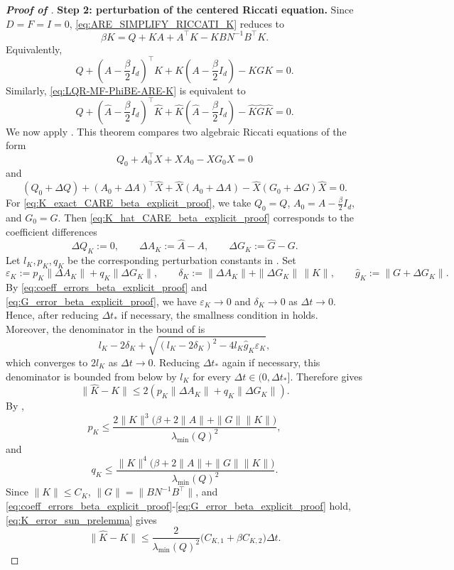 \documentclass[a4paper, 10pt, english, reqno]{amsart}
\begin{document}
\begin{proof}[\textbf{Proof of }]
\medskip
\noindent
\textbf{Step 2: perturbation of the centered Riccati equation.}
Since $D=F=I=0$, \eqref{eq:ARE_SIMPLIFY_RICCATI_K} reduces to
\[
  \beta K
  =
  Q+KA+A^\top K-KBN^{-1}B^\top K.
\]
Equivalently,
\begin{equation}
\label{eq:K_exact_CARE_beta_explicit_proof}
  Q
  +
  \left(A-\frac{\beta}{2}I_d\right)^\top K
  +
  K\left(A-\frac{\beta}{2}I_d\right)
  -
  KGK
  =
  0.
\end{equation}
Similarly, \eqref{eq:LQR-MF-PhiBE-ARE-K} is equivalent to
\begin{equation}
\label{eq:K_hat_CARE_beta_explicit_proof}
  Q
  +
  \left(\hat A-\frac{\beta}{2}I_d\right)^\top\hat K
  +
  \hat K\left(\hat A-\frac{\beta}{2}I_d\right)
  -
  \hat K\hat G\hat K
  =
  0.
\end{equation}
We now apply \cite[Theorem~3.1]{Sun1998}. This theorem compares two algebraic Riccati equations of the form
\[
Q_0+A_0^\top X+XA_0-XG_0X=0
\]
and
\[
(Q_0+\Delta Q)+(A_0+\Delta A)^\top \hat X+\hat X(A_0+\Delta A)-\hat X(G_0+\Delta G)\hat X=0.
\]
For \eqref{eq:K_exact_CARE_beta_explicit_proof}, we take $Q_0=Q$, $A_0=A-\frac{\beta}{2}I_d$, and $G_0=G$. Then \eqref{eq:K_hat_CARE_beta_explicit_proof} corresponds to the coefficient differences
\[
\Delta Q_K:=0,
\qquad
\Delta A_K:=\hat A-A,
\qquad
\Delta G_K:=\hat G-G.
\]
Let $l_K,p_K,q_K$ be the corresponding perturbation constants in \cite[Theorem~3.1]{Sun1998}. Set
\[
\varepsilon_K:=p_K\|\Delta A_K\|+q_K\|\Delta G_K\|,
\qquad
\delta_K:=\|\Delta A_K\|+\|\Delta G_K\|\,\|K\|,
\qquad
\hat g_K:=\|G+\Delta G_K\|.
\]
By \eqref{eq:coeff_errors_beta_explicit_proof} and \eqref{eq:G_error_beta_explicit_proof}, we have $\varepsilon_K\to0$ and $\delta_K\to0$ as $\Delta t\to0$. Hence, after reducing $\Delta t_*$ if necessary, the smallness condition in \cite[Theorem~3.1]{Sun1998} holds. Moreover, the denominator in the bound of \cite[Theorem~3.1]{Sun1998} is
\[
l_K-2\delta_K+
\sqrt{(l_K-2\delta_K)^2-4l_K\hat g_K\varepsilon_K},
\]
which converges to $2l_K$ as $\Delta t\to0$. Reducing $\Delta t_*$ again if necessary, this denominator is bounded from below by $l_K$ for every $\Delta t\in(0,\Delta t_*]$. Therefore \cite[Theorem~3.1]{Sun1998} gives
\begin{equation}
\label{eq:K_error_sun_prelemma}
  \|\hat K-K\|
  \le
  2\left(p_K\|\Delta A_K\|+q_K\|\Delta G_K\|\right).
\end{equation}
By ,
\[
  p_K
  \le
  \frac{
    2\|K\|^3
    \bigl(\beta+2\|A\|+\|G\|\|K\|\bigr)
  }{
    \lambda_{\min}(Q)^2
  },
\]
and
\[
  q_K
  \le
  \frac{
    \|K\|^4
    \bigl(\beta+2\|A\|+\|G\|\|K\|\bigr)
  }{
    \lambda_{\min}(Q)^2
  }.
\]
Since $\|K\|\le C_K$, $\|G\|=\|BN^{-1}B^\top\|$, and \eqref{eq:coeff_errors_beta_explicit_proof}-\eqref{eq:G_error_beta_explicit_proof} hold, \eqref{eq:K_error_sun_prelemma} gives
\begin{equation}
\label{eq:K_error_beta_explicit_proof}
  \|\hat K-K\|
  \le
  \frac{2}{\lambda_{\min}(Q)^2}
  \bigl(C_{K,1}+\beta C_{K,2}\bigr)\Delta t.
\end{equation}


\end{proof}
\end{document}

